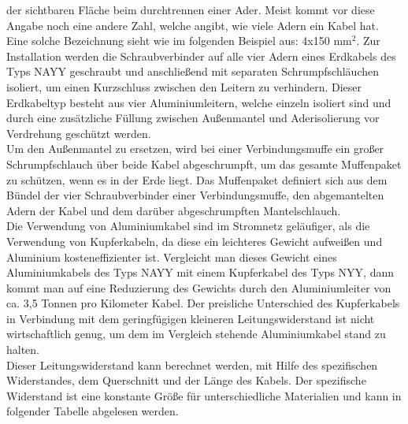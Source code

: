 der sichtbaren Fläche beim durchtrennen einer Ader. Meist kommt vor diese Angabe noch eine andere Zahl, welche angibt, wie viele Adern ein Kabel hat. Eine 
solche Bezeichnung sieht wie im folgenden Beispiel aus: 4x150 $\text{mm}^2$. Zur Installation werden die Schraubverbinder auf alle vier Adern eines Erdkabels des 
Typs NAYY geschraubt und anschließend mit separaten Schrumpfschläuchen isoliert, um einen Kurzschluss zwischen den Leitern zu verhindern. Dieser Erdkabeltyp 
besteht aus vier Aluminiumleitern, welche einzeln isoliert sind und durch eine zusätzliche Füllung zwischen Außenmantel und Aderisolierung vor Verdrehung 
geschützt werden. \autocite{NKT_NAYY}
\\
Um den Außenmantel zu ersetzen, wird bei einer Verbindungsmuffe ein großer Schrumpfschlauch über beide Kabel abgeschrumpft, um das gesamte Muffenpaket zu 
schützen, wenn es in der Erde liegt. Das Muffenpaket definiert sich aus dem Bündel der vier Schraubverbinder einer Verbindungsmuffe, den abgemantelten Adern 
der Kabel und dem darüber abgeschrumpften Mantelschlauch. \autocite{Cellpack}
\\
Die Verwendung von Aluminiumkabel sind im Stromnetz geläufiger, als die Verwendung von Kupferkabeln, da diese ein leichteres Gewicht aufweißen und Aluminium 
kosteneffizienter ist. Vergleicht man dieses Gewicht eines Aluminiumkabels des Typs NAYY mit einem Kupferkabel des Typs NYY, dann kommt man auf eine 
Reduzierung des Gewichts durch den Aluminiumleiter von ca. 3,5 Tonnen pro Kilometer Kabel. Der preisliche Unterschied des Kupferkabels in Verbindung mit dem 
geringfügigen kleineren Leitungswiderstand ist nicht wirtschaftlich genug, um dem im Vergleich stehende Aluminiumkabel stand zu halten. \autocite{NKT_NYY}
\\
Dieser Leitungswiderstand kann berechnet werden, mit Hilfe des spezifischen Widerstandes, dem Querschnitt und der Länge des Kabels. 
\clearpage
Der spezifische Widerstand ist eine konstante Größe für unterschiedliche Materialien und kann in folgender Tabelle abgelesen werden.
